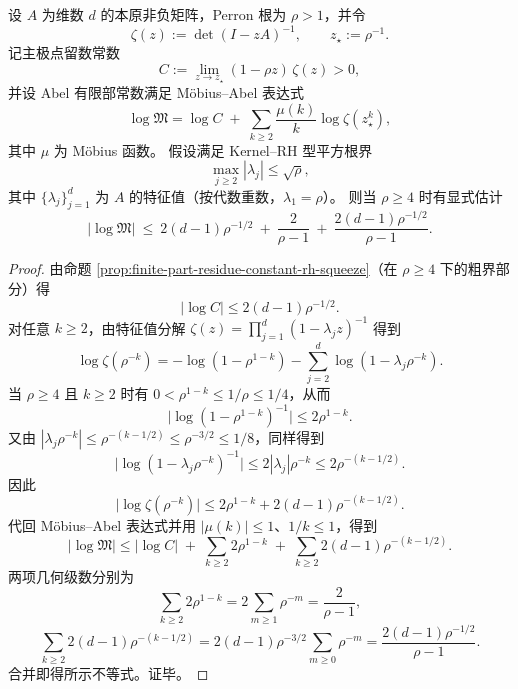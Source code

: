 
\begin{proposition}\label{prop:finite-part-logM-kernel-rh-explicit-bound}
设 \(A\) 为维数 \(d\) 的本原非负矩阵，Perron 根为 \(\rho>1\)，并令
\[
\zeta(z):=\det(I-zA)^{-1},\qquad z_\star:=\rho^{-1}.
\]
记主极点留数常数
\[
C:=\lim_{z\to z_\star}(1-\rho z)\,\zeta(z)>0,
\]
并设 Abel 有限部常数满足 Möbius--Abel 表达式
\[
\log\mathfrak{M}
=
\log C
\;+\;
\sum_{k\ge 2}\frac{\mu(k)}{k}\log\zeta(z_\star^{k}),
\]
其中 \(\mu\) 为 Möbius 函数。
假设满足 Kernel--RH 型平方根界
\[
\max_{j\ge 2}|\lambda_j|\le \sqrt{\rho},
\]
其中 \(\{\lambda_j\}_{j=1}^d\) 为 \(A\) 的特征值（按代数重数，\(\lambda_1=\rho\)）。
则当 \(\rho\ge 4\) 时有显式估计
\[
|\log\mathfrak{M}|
\ \le\
2(d-1)\rho^{-1/2}
\ +\ \frac{2}{\rho-1}
\ +\ \frac{2(d-1)\rho^{-1/2}}{\rho-1}.
\]
\end{proposition}
\begin{proof}
由命题 \ref{prop:finite-part-residue-constant-rh-squeeze}（在 \(\rho\ge 4\) 下的粗界部分）得
\[
|\log C|\le 2(d-1)\rho^{-1/2}.
\]
对任意 \(k\ge 2\)，由特征值分解
\(
\zeta(z)=\prod_{j=1}^{d}(1-\lambda_j z)^{-1}
\)
得到
\[
\log\zeta(\rho^{-k})
=-\log(1-\rho^{1-k})-\sum_{j=2}^{d}\log(1-\lambda_j\rho^{-k}).
\]
当 \(\rho\ge 4\) 且 \(k\ge 2\) 时有 \(0<\rho^{1-k}\le 1/\rho\le 1/4\)，从而
\[
\bigl|\log(1-\rho^{1-k})^{-1}\bigr|\le 2\rho^{1-k}.
\]
又由 \(|\lambda_j\rho^{-k}|\le \rho^{-(k-1/2)}\le \rho^{-3/2}\le 1/8\)，同样得到
\[
\bigl|\log(1-\lambda_j\rho^{-k})^{-1}\bigr|\le 2|\lambda_j|\rho^{-k}\le 2\rho^{-(k-1/2)}.
\]
因此
\[
\bigl|\log\zeta(\rho^{-k})\bigr|
\le 2\rho^{1-k}+2(d-1)\rho^{-(k-1/2)}.
\]
代回 Möbius--Abel 表达式并用 \(|\mu(k)|\le 1\)、\(1/k\le 1\)，得到
\[
|\log\mathfrak{M}|
\le |\log C|
\;+\;
\sum_{k\ge 2}2\rho^{1-k}
\;+\;
\sum_{k\ge 2}2(d-1)\rho^{-(k-1/2)}.
\]
两项几何级数分别为
\[
\sum_{k\ge 2}2\rho^{1-k}=2\sum_{m\ge 1}\rho^{-m}=\frac{2}{\rho-1},
\]
\[
\sum_{k\ge 2}2(d-1)\rho^{-(k-1/2)}
=2(d-1)\rho^{-3/2}\sum_{m\ge 0}\rho^{-m}
=\frac{2(d-1)\rho^{-1/2}}{\rho-1}.
\]
合并即得所示不等式。证毕。
\end{proof}

\endinput
